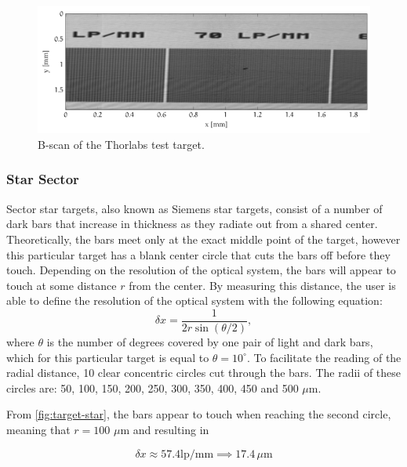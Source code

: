 \begin{figure}[hbt]
	\centering
	\includegraphics[width=1\linewidth]{gfx/ch4/axsun/target/ronchi-detail}
	\caption{B-scan of the Thorlabs test target.}\label{fig:target-ronchi-detail}
\end{figure}

\subsubsection{Star Sector}
Sector star targets, also known as Siemens star targets, consist of a number of dark bars that increase in thickness as they radiate out from a shared center. Theoretically, the bars meet only at the exact middle point of the target, however this particular target has a blank center circle that cuts the bars off before they touch. Depending on the resolution of the optical system, the bars will appear to touch at some distance $r$ from the center. By measuring this distance, the user is able to define the resolution of the optical system with the following equation:
\begin{equation}
 \delta x  = \frac{1}{2r \sin(\theta / 2)},
\end{equation}
where $\theta$ is the number of degrees covered by one pair of light and dark bars, which for this particular target is equal to $\theta = 10^\circ$. To facilitate the reading of the radial distance, 10 clear concentric circles cut through the bars. The radii of these circles are: 50, 100, 150, 200, 250, 300, 350, 400, 450 and 500 $\mu$m. 

From \autoref{fig:target-star}, the bars appear to touch when reaching the second circle, meaning that $r = 100$ $\mu$m and resulting in

\begin{equation}
	\delta x \approx 57.4 \text{lp/mm} \implies 17.4\, \mu\text{m}
\end{equation}


